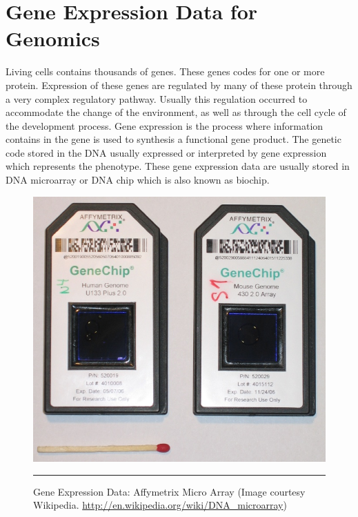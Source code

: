 \section{Gene Expression Data for Genomics }
Living cells contains thousands of genes. These genes codes for one or more protein. Expression of 
these genes are regulated by many of these protein through a very complex regulatory pathway.
Usually this regulation occurred to accommodate the change of the environment, as well as through 
the cell cycle of the development process. %
Gene expression is the process where information contains in the gene is used to synthesis a 
functional gene product. The genetic code stored in the DNA usually expressed or interpreted by 
gene expression which represents the  phenotype. 
These gene expression data are usually stored in DNA microarray or DNA chip which is also known as
biochip. 

\begin{figure}[b]
	\centering
		\includegraphics[width=.4\textwidth,keepaspectratio]{diagrams/Affymetrix-microarray.jpg}
		\rule{35em}{0.5pt}
	\caption{Gene Expression Data: Affymetrix Micro Array
	(Image courtesy Wikipedia. 
	\url{http://en.wikipedia.org/wiki/DNA_microarray})}
	\label{fig:Affymetrix-microarray}
\end{figure}
 
